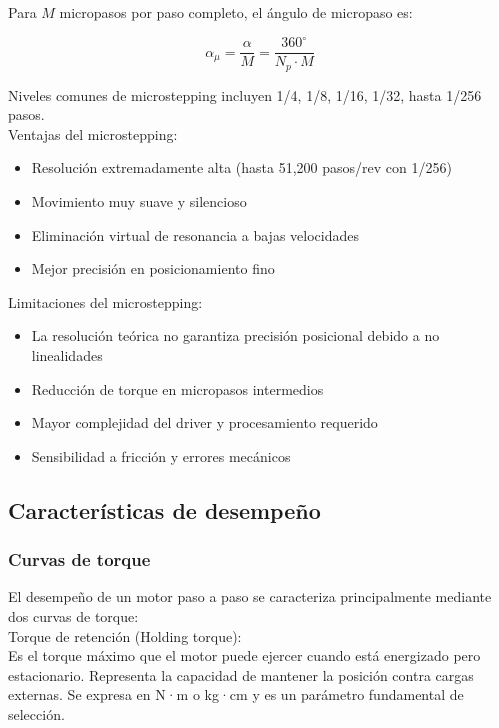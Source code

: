 Para $M$ micropasos por paso completo, el ángulo de micropaso es:

\begin{equation}
\alpha_{\mu} = \frac{\alpha}{M} = \frac{360^\circ}{N_p \cdot M}
\end{equation}

Niveles comunes de microstepping incluyen 1/4, 1/8, 1/16, 1/32, hasta 1/256 pasos.\\

Ventajas del microstepping:

\begin{itemize}[label=$\bullet$]
    \item Resolución extremadamente alta (hasta 51,200 pasos/rev con 1/256)
    \item Movimiento muy suave y silencioso
    \item Eliminación virtual de resonancia a bajas velocidades
    \item Mejor precisión en posicionamiento fino\\
\end{itemize}

Limitaciones del microstepping:

\begin{itemize}[label=$\bullet$]
    \item La resolución teórica no garantiza precisión posicional debido a no linealidades
    \item Reducción de torque en micropasos intermedios
    \item Mayor complejidad del driver y procesamiento requerido
    \item Sensibilidad a fricción y errores mecánicos
\end{itemize}

\subsection{Características de desempeño}

\subsubsection{Curvas de torque}

El desempeño de un motor paso a paso se caracteriza principalmente mediante dos curvas de torque:\\

Torque de retención (Holding torque):\\
\noindent
Es el torque máximo que el motor puede ejercer cuando está energizado pero estacionario. Representa la capacidad de mantener la posición contra cargas externas. Se expresa en N·m o kg·cm y es un parámetro fundamental de selección.\\

